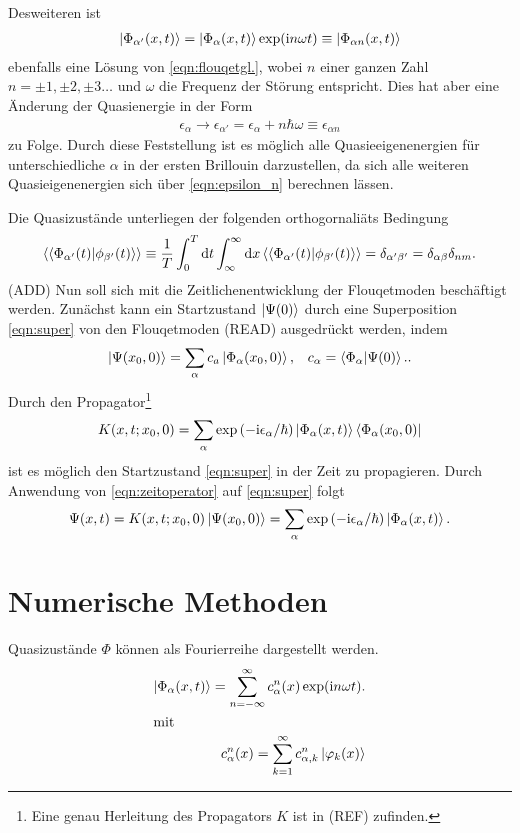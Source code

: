 Desweiteren ist
\begin{align}
  \ket{\Phi_{\alpha '}(x,t)}=\ket{\Phi_\alpha(x,t)}\exp(\mathrm{i}n\omega t) \equiv \ket{\Phi_{\alpha n}(x,t)}
\end{align}
ebenfalls eine Lösung von \eqref{eqn:flouqetgl.},  wobei $n$ einer ganzen Zahl $n=\pm1,\pm2,\pm3 \dots$
und $\omega$ die Frequenz der Störung entspricht. Dies hat aber eine Änderung der Quasienergie in der Form
\begin{align*}
    \epsilon_\alpha \rightarrow \epsilon_{\alpha '}=\epsilon_\alpha+n\hbar \omega\equiv\epsilon_{\alpha n} \label{eqn:epsilon_n}
\end{align*}
zu Folge.
Durch diese Feststellung ist es
möglich alle Quasieeigenenergien für unterschiedliche $\alpha$
in der ersten Brillouin darzustellen, da sich alle weiteren
Quasieigenenergien sich über \eqref{eqn:epsilon_n} berechnen lässen.


Die Quasizustände unterliegen der folgenden orthogornaliäts Bedingung
\begin{align}
  \braket{\braket{\Phi_{\alpha' }(t)|\phi_{\beta'}(t)}}\equiv \frac{1}{T} \int_0^T\mathrm{d}t \int_{\infty}^{\infty} \mathrm{d}x
   \braket{\braket{\Phi_{\alpha' }(t)|\phi_{\beta'}(t)}}=\delta_{\alpha'\beta'}=\delta_{\alpha\beta}\delta_{nm}.
\end{align}
(ADD)
Nun soll sich mit die Zeitlichenentwicklung der Flouqetmoden
beschäftigt werden.
Zunächst kann ein Startzustand $\ket{\Psi(0)}$ durch eine
Superposition \eqref{eqn:super} von den Flouqetmoden (READ) ausgedrückt werden, indem
\begin{align}
  \ket{\Psi(x_0,0)}=\sum_\alpha c_a\ket{\Phi_\alpha(x_0,0)},&   &c_\alpha=\braket{\Phi_\alpha|\Psi(0)}.  \label{eqn:super}.
\end{align}
Durch den Propagator\footnote{Eine genau Herleitung des Propagators $K$ ist in (REF) zufinden.}
\begin{align}
  K(x,t;x_0,0)=\sum_\alpha \exp\left(-\mathrm{i}\epsilon_\alpha/ \hbar \right)\ket{\Phi_\alpha(x,t)}\bra{\Phi_\alpha(x_0,0)} \label{eqn:zeitoperator}
\end{align}
ist es möglich den Startzustand \eqref{eqn:super}
in der Zeit zu propagieren.
Durch Anwendung von \eqref{eqn:zeitoperator} auf \eqref{eqn:super}
folgt
\begin{align}
  \Psi(x,t)=K(x,t;x_0,0) \ket{\Psi(x_0,0)}=\sum_\alpha \exp\left(-\mathrm{i}\epsilon_\alpha/ \hbar \right)\ket{\Phi_\alpha(x,t)}.
\end{align}

\section{Numerische Methoden}

Quasizustände $\Phi$ können als Fourierreihe  dargestellt werden.
\begin{align}
  \ket{\Phi_{\alpha}(x,t)}=\sum_{n=-\infty}^{\infty} c_{\alpha}^n (x)
  \exp(\mathrm{i}n\omega t).\\
\intertext{mit}
 c_\alpha^n(x)=\sum_{k=1}^\infty c_{\alpha,k}^n \ket{\varphi_k(x)} %
\end{align}
